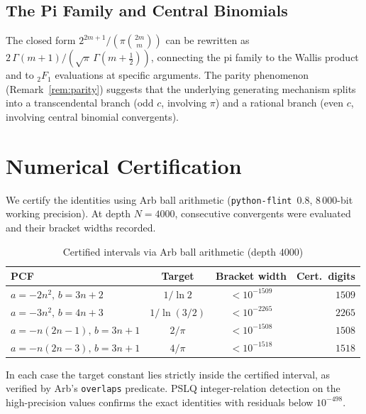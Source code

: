 \documentclass[11pt,a4paper]{article}
\theoremstyle{plain}
\theoremstyle{remark}
\begin{document}
\subsection{The Pi Family and Central Binomials}

The closed form $2^{2m+1}/(\pi\binom{2m}{m})$ can be rewritten as
$2\,\Gamma(m{+}1)/(\sqrt{\pi}\,\Gamma(m{+}\tfrac12))$, connecting
the pi family to the Wallis product and to ${}_2F_1$ evaluations at
specific arguments.
The parity phenomenon (Remark~\ref{rem:parity}) suggests that the
underlying generating mechanism splits into a transcendental branch
(odd $c$, involving $\pi$) and a rational branch (even $c$, involving
central binomial convergents).

\section{Numerical Certification}\label{sec:cert}

We certify the identities using Arb ball arithmetic
(\texttt{python-flint}~0.8, 8\,000-bit working precision).
At depth $N=4000$, consecutive convergents were evaluated and their
bracket widths recorded.

\begin{table}[h]
\centering
\caption{Certified intervals via Arb ball arithmetic (depth $4000$)}
\label{tab:certified}
\begin{tabular}{@{}lccr@{}}
\toprule
PCF & Target & Bracket width & Cert.\ digits \\
\midrule
$a = -2n^2,\, b = 3n{+}2$     & $1/\ln 2$     & $< 10^{-1509}$ & $1509$ \\
$a = -3n^2,\, b = 4n{+}3$     & $1/\ln(3/2)$  & $< 10^{-2265}$ & $2265$ \\
$a = -n(2n{-}1),\, b = 3n{+}1$ & $2/\pi$       & $< 10^{-1508}$ & $1508$ \\
$a = -n(2n{-}3),\, b = 3n{+}1$ & $4/\pi$       & $< 10^{-1518}$ & $1518$ \\
\bottomrule
\end{tabular}
\end{table}

\noindent In each case the target constant lies strictly inside the
certified interval, as verified by Arb's \texttt{overlaps} predicate.
PSLQ integer-relation detection on the high-precision values confirms
the exact identities with residuals below $10^{-498}$.
\end{document}

